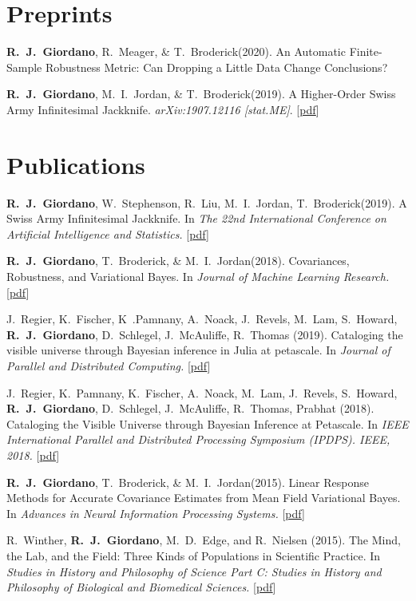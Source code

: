 \documentclass[margin,line]{res}
\newcommand{\me}{\textbf{R.~J.~Giordano}\xspace}
\newcommand{\tamara}{T.~Broderick\xspace}
\newcommand{\mike}{M.~I.~Jordan\xspace}
\newcommand{\runjing}{R.~Liu\xspace}
\newcommand{\paperref}[1]{[\href{#1}{pdf}]}
\newcommand{\paperref}[1]{}
\begin{document}
\begin{resume}
\section{\sc Preprints}

\me, R.~Meager, \& \tamara (2020).
An Automatic Finite-Sample Robustness Metric: Can Dropping a Little Data Change Conclusions?

\me, \mike, \& \tamara (2019).
A Higher-Order Swiss Army Infinitesimal Jackknife.
\emph{arXiv:1907.12116 [stat.ME]}.
\paperref{https://arxiv.org/abs/1907.12116}

\section{\sc Publications}

\me, W.~Stephenson, \runjing, \mike, \tamara (2019).  A Swiss Army Infinitesimal
Jackknife. In \emph{The 22nd International Conference on Artificial Intelligence
and Statistics.}
\paperref{https://arxiv.org/abs/1806.00550}

\me, \tamara, \& \mike (2018).  Covariances, Robustness, and Variational Bayes.
In \emph{Journal of Machine Learning Research.}
\paperref{https://arxiv.org/abs/1709.02536}

J.~Regier, K.~Fischer, K~.Pamnany, A.~Noack, J.~Revels, M.~Lam, S.~Howard,
\me, D.~Schlegel, J.~McAuliffe, R.~Thomas (2019). Cataloging the visible
universe through Bayesian inference in Julia at petascale. In \emph{Journal of
Parallel and Distributed Computing.}
\paperref{https://doi.org/10.1016/j.jpdc.2018.12.008}

J.~Regier, K.~Pamnany, K.~Fischer, A.~Noack, M.~Lam, J.~Revels, S.~Howard, \me,
D.~Schlegel, J.~McAuliffe, R.~Thomas, Prabhat (2018).  Cataloging the Visible
Universe through Bayesian Inference at Petascale.  In \emph{IEEE International
Parallel and Distributed Processing Symposium (IPDPS). IEEE, 2018.}
\paperref{https://arxiv.org/abs/1801.10277}

\me, \tamara, \& \mike (2015). Linear Response Methods for Accurate Covariance
Estimates from Mean Field Variational Bayes. In \emph{Advances in Neural
Information Processing Systems.}
\paperref{https://arxiv.org/abs/1506.04088}

R.~Winther, \me, M.~D.~Edge, and R.~Nielsen (2015).  The Mind, the Lab, and the
Field: Three Kinds of Populations in Scientific Practice.  In \emph{Studies in
History and Philosophy of Science Part C: Studies in History and Philosophy of
Biological and Biomedical Sciences.}
\paperref{https://doi.org/10.1016/j.shpsc.2015.01.009}



\end{resume}
\end{document}
